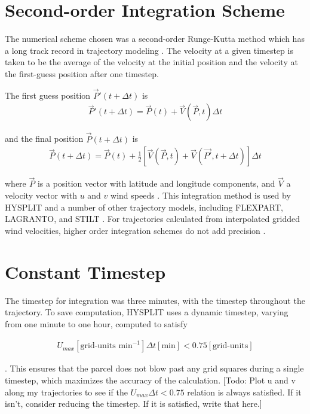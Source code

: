 \section{Second-order Integration Scheme}
The numerical scheme chosen was a second-order Runge-Kutta method which has a long track record in trajectory modeling \cite{petterssen_weather_1940}.
The velocity at a given timestep is taken to be the average of the velocity at the initial position and the velocity at the first-guess position after one timestep.

The first guess position $\vec{P}' (t + \Delta t)$ is 
\begin{align}
\vec{P}' (t + \Delta t) = \vec{P}(t) + \vec{V} (\vec{P}, t) \Delta t
\end{align}

and the final position $\vec{P} (t + \Delta t)$ is
\begin{align}
\vec{P} (t + \Delta t) = \vec{P} (t) + \frac{1}{2} \left [ \vec{V} (\vec{P}, t) + \vec{V} (\vec{P'}, t + \Delta t) \right ] \Delta t
\end{align}

where $\vec{P}$ is a position vector with latitude and longitude components, and $\vec{V}$ a velocity vector with $u$ and $v$ wind speeds \cite{draxler_description_1997}.
This integration method is used by HYSPLIT and a number of other trajectory models, including FLEXPART, LAGRANTO, and STILT \cite{stein_noaas_2015} \cite{bowman_input_2013}. 
For trajectories calculated from interpolated gridded wind velocities, higher order integration schemes do not add precision \cite{draxler_description_1997}.  

\section{Constant Timestep}
The timestep for integration was three minutes, with the timestep throughout the trajectory. 
To save computation, HYSPLIT uses a dynamic timestep, varying from one minute to one hour, computed to satisfy

\begin{align}
U_{max} [\text{grid-units min}^{-1}] \Delta t [\text{min}] < 0.75 [\text{grid-units}] 
\end{align}

\cite{draxler_description_1997}. This ensures that the parcel does not blow past any grid squares during a single timestep, which maximizes the accuracy of the calculation. 
[Todo: Plot u and v along my trajectories to see if the $U_{max} \Delta t < 0.75$ relation is always satisfied. If it isn't, consider reducing the timestep. If it is satisfied, write that here.]

